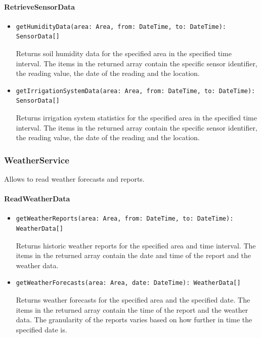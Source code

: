 \documentclass{article}
\begin{document}
\paragraph{RetrieveSensorData}
\begin{itemize}
\item \begin{verbatim}
getHumidityData(area: Area, from: DateTime, to: DateTime): SensorData[]
\end{verbatim}
Returns soil humidity data for the specified area in the specified time interval.
The items in the returned array contain the specific sensor identifier, the reading value, the date of the reading and the location.
\item \begin{verbatim}
getIrrigationSystemData(area: Area, from: DateTime, to: DateTime): SensorData[]
\end{verbatim}
Returns irrigation system statistics for the specified area in the specified time interval. The items in the returned array contain the specific sensor identifier, the reading value, the date of the reading and the location.
\end{itemize}

\subsubsection{WeatherService}
Allows to read weather forecasts and reports.

\paragraph{ReadWeatherData}
\begin{itemize}
\item \begin{verbatim}
getWeatherReports(area: Area, from: DateTime, to: DateTime): WeatherData[]
\end{verbatim}
Returns historic weather reports for the specified area and time interval.
The items in the returned array contain the date and time of the report and the weather data.
\item \begin{verbatim}
getWeatherForecasts(area: Area, date: DateTime): WeatherData[]
\end{verbatim}
Returns weather forecasts for the specified area and the specified date.
The items in the returned array contain the time of the report and the weather data.
The granularity of the reports varies based on how further in time the specified date is.
\end{itemize}
\end{document}
